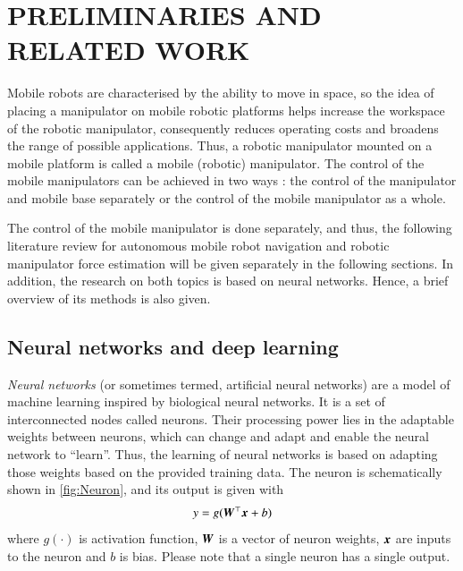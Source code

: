 \chapter{PRELIMINARIES AND RELATED WORK}
\label{chap:Literature}
    
Mobile robots are characterised by the ability to move in space, so the idea of placing a manipulator on mobile robotic platforms helps increase the workspace of the robotic manipulator, consequently reduces operating costs and broadens the range of possible applications. Thus, a robotic manipulator mounted on a mobile platform is called a mobile (robotic) manipulator. The control of the mobile manipulators can be achieved in two ways \cite{Nassal1994}: the control of the manipulator and mobile base separately or the control of the mobile manipulator as a whole.

The control of the mobile manipulator is done separately, and thus, the following literature review for autonomous mobile robot navigation and robotic manipulator force estimation will be given separately in the following sections. In addition, the research on both topics is based on neural networks. Hence, a brief overview of its methods is also given.

\section{Neural networks and deep learning}

\emph{Neural networks} (or sometimes termed, artificial neural networks) are a model of machine learning inspired by biological neural networks. It is a set of interconnected nodes called neurons. Their processing power lies in the adaptable weights between neurons, which can change and adapt and enable the neural network to ``learn''. Thus, the learning of neural networks is based on adapting those weights based on the provided training data. The neuron is schematically shown in \cref{fig:Neuron}, and its output is given with
\[
    y = g({\bm{W}}^{\top}{\bm{x}} + b)
    \label{eq:Neuron}
\]
where $g(\cdot)$ is activation function, ${\bm{W}}$ is a vector of neuron weights, ${\bm{x}}$ are inputs to the neuron and $b$ is bias. Please note that a single neuron has a single output.

